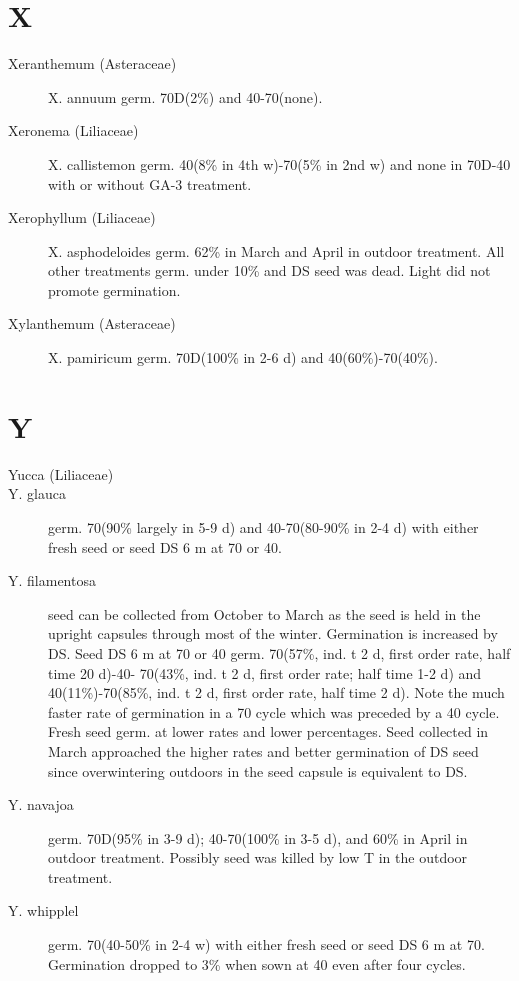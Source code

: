 \section{X}
\begin{description}
\item[Xeranthemum (Asteraceae)] X. annuum germ. 70D(2\%) and 40-70(none).
\item[Xeronema (Liliaceae)] X. callistemon germ. 40(8\% in 4th w)-70(5\% in 2nd
w) and none in 70D-40 with or without GA-3 treatment.
\item[Xerophyllum (Liliaceae)] X. asphodeloides germ. 62\% in March and April
in outdoor treatment. All other treatments germ. under 10\% and DS seed was dead.
Light did not promote germination.
\item[Xylanthemum (Asteraceae)] X. pamiricum germ. 70D(100\% in 2-6 d) and
40(60\%)-70(40\%).
\end{description}

\section{Y}
\begin{description}
\item[Yucca (Liliaceae)]
\item[Y. glauca] germ. 70(90\% largely in 5-9 d) and 40-70(80-90\% in 2-4 d) with either
fresh seed or seed DS 6 m at 70 or 40.
\item[Y. filamentosa] seed can be collected from October to March as the seed is held
in the upright capsules through most of the winter. Germination is increased by DS.
Seed DS 6 m at 70 or 40 germ. 70(57\%, ind. t 2 d, first order rate, half time 20 d)-40-
70(43\%, ind. t 2 d, first order rate; half time 1-2 d) and 40(11\%)-70(85\%, ind. t 2 d, first
order rate, half time 2 d). Note the much faster rate of germination in a 70 cycle which
was preceded by a 40 cycle. Fresh seed germ. at lower rates and lower percentages.
Seed collected in March approached the higher rates and better germination of DS
seed since overwintering outdoors in the seed capsule is equivalent to DS.
\item[Y. navajoa] germ. 70D(95\% in 3-9 d); 40-70(100\% in 3-5 d), and 60\% in April in
outdoor treatment. Possibly seed was killed by low T in the outdoor treatment.
\item[Y. whipplel] germ. 70(40-50\% in 2-4 w) with either fresh seed or seed DS 6 m at
70. Germination dropped to 3\% when sown at 40 even after four cycles.
\end{description}

